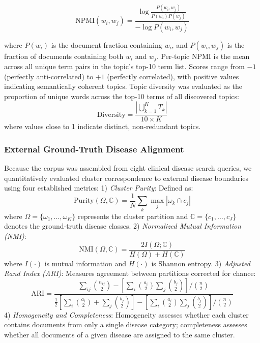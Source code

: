 \documentclass[a4paper,fleqn]{cas-dc}
\begin{document}
\begin{equation}
\text{NPMI}(w_i, w_j) = \frac{\log \frac{P(w_i, w_j)}{P(w_i) P(w_j)}}{-\log P(w_i, w_j)}
\end{equation}

where $P(w_i)$ is the document fraction containing $w_i$, and $P(w_i, w_j)$ is the fraction of documents containing both $w_i$ and $w_j$. Per-topic NPMI is the mean across all unique term pairs in the topic's top-10 term list. Scores range from $-1$ (perfectly anti-correlated) to $+1$ (perfectly correlated), with positive values indicating semantically coherent topics. Topic diversity was evaluated as the proportion of unique words across the top-10 terms of all discovered topics:
\begin{equation}
\text{Diversity} = \frac{| \bigcup_{k=1}^K T_k |}{10 \times K}
\end{equation}
where values close to 1 indicate distinct, non-redundant topics.

\subsubsection{External Ground-Truth Disease Alignment}

Because the corpus was assembled from eight clinical disease search queries, we quantitatively evaluated cluster correspondence to external disease boundaries using four established metrics:
1) \textit{Cluster Purity}: Defined as:
\begin{equation}
\text{Purity}(\Omega, \mathbb{C}) = \frac{1}{N} \sum_{k} \max_j |\omega_k \cap c_j|
\end{equation}
where $\Omega = \{\omega_1, \dots, \omega_K\}$ represents the cluster partition and $\mathbb{C} = \{c_1, \dots, c_J\}$ denotes the ground-truth disease classes.
2) \textit{Normalized Mutual Information (NMI)}:
\begin{equation}
\text{NMI}(\Omega, \mathbb{C}) = \frac{2 I(\Omega; \mathbb{C})}{H(\Omega) + H(\mathbb{C})}
\end{equation}
where $I(\cdot)$ is mutual information and $H(\cdot)$ is Shannon entropy.
3) \textit{Adjusted Rand Index (ARI)}: Measures agreement between partitions corrected for chance:
\begin{equation}
\text{ARI} = \frac{\sum_{ij} \binom{n_{ij}}{2} - \left[ \sum_i \binom{a_i}{2} \sum_j \binom{b_j}{2} \right] / \binom{n}{2}}{\frac{1}{2} \left[ \sum_i \binom{a_i}{2} + \sum_j \binom{b_j}{2} \right] - \left[ \sum_i \binom{a_i}{2} \sum_j \binom{b_j}{2} \right] / \binom{n}{2}}
\end{equation}
4) \textit{Homogeneity and Completeness}: Homogeneity assesses whether each cluster contains documents from only a single disease category; completeness assesses whether all documents of a given disease are assigned to the same cluster.
\end{document}
